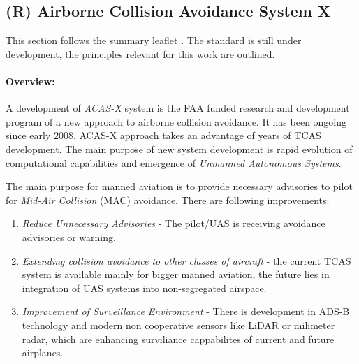 \subsection{(R) Airborne Collision Avoidance System X}\label{sec:ACASX}
\noindent This section follows the summary leaflet \cite{netalert2013n17}. The standard is still under development, the principles relevant for this work are outlined. 

\paragraph{Overview:} A development of \emph{ACAS-X} system is the FAA funded research and development program of a new approach to airborne collision avoidance. It has been ongoing since early 2008. ACAS-X approach takes an advantage of years of TCAS development. The main purpose of new system development is rapid evolution of computational capabilities and emergence of \emph{Unmanned Autonomous  Systems}.

The main purpose for manned aviation is to provide necessary advisories to pilot for \emph{Mid-Air Collision} (MAC) avoidance. There are following improvements:

\begin{enumerate}
    \item \emph{Reduce Unnecessary Advisories} - The pilot/UAS is receiving avoidance advisories or warning. 
    
    \item \emph{Extending collision avoidance to other classes of aircraft} - the current TCAS system is available mainly for bigger manned aviation, the future lies in integration of UAS systems into non-segregated airspace.
    
    \item \emph{Improvement of Surveillance Environment} - There is development in ADS-B technology and modern non cooperative sensors like LiDAR or milimeter radar, which are enhancing surviliance cappabilites of current and future airplanes.
\end{enumerate}

